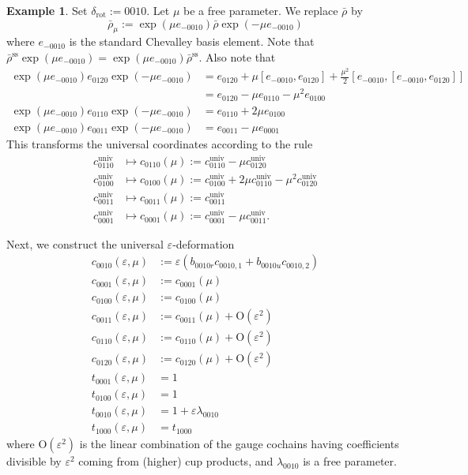 \documentclass[11pt]{amsart}
\newcommand{\MINOREDITED}[1]{#1}
\theoremstyle{definition}
\newtheorem{example}[thm]{Example}
\renewcommand{\SS}{{\operatorname{ss}}}
\newcommand{\rot}{{\operatorname{rot}}}
\newcommand{\univ}{{\operatorname{univ}}}
\begin{document}
\begin{example}
Set $\delta_{\rot}:=0010$.
Let $\mu$
be a free parameter.
We replace
$\bar\rho$ by
\[
\bar\rho_\mu:=\exp(\mu e_{-0010})\bar\rho \exp(-\mu e_{-0010})
\]
where $e_{-0010}$ is the standard Chevalley basis element.
Note that
$\bar\rho^\SS\exp(\mu e_{-0010})=\exp(\mu e_{-0010})\bar\rho^\SS$.
Also note that
\begin{align*}
\exp(\mu e_{-0010})e_{0120} \exp(-\mu e_{-0010})
&=e_{0120}
+ \mu[e_{-0010},e_{0120}]
+ \frac{\mu^2}{2}[e_{-0010},[e_{-0010},e_{0120}]]
\\&=
e_{0120}
-\mu e_{0110}
-\mu^2 e_{0100}
\\
\exp(\mu e_{-0010})e_{0110} \exp(-\mu e_{-0010})
&=
e_{0110} + 2\mu e_{0100}
\\
\exp(\mu e_{-0010})e_{0011} \exp(-\mu e_{-0010})
&=
e_{0011} -\mu e_{0001}
\end{align*}
This transforms the universal coordinates
according to the rule
\begin{align*}
c_{0110}^\univ &\mapsto
c_{0110}(\mu):=  c^{\univ}_{0110}-\mu c^{\univ}_{0120}\\
c^\univ_{0100} &\mapsto c_{0100}(\mu):= 
c^\univ_{0100}+2\mu c^\univ_{0110}
-\mu^2c^\univ_{0120}\\
c^\univ_{0011} &\mapsto c_{0011}(\mu):= 
c_{0011}^\univ\\
c^\univ_{0001} &\mapsto c_{0001}(\mu):= 
c^\univ_{0001}-\mu c^\univ_{\MINOREDITED{0011}}.
\end{align*}

Next, we construct the universal
$\varepsilon$-deformation
\begin{align*}
c_{0010}(\varepsilon, \mu)&:=
\varepsilon (b_{0010r}c_{0010,1}
+b_{0010u}c_{0010,2}) \\
c_{0001}(\varepsilon, \mu)&:=
c_{0001}(\mu) \\
c_{0100}(\varepsilon, \mu)&:=
c_{0100}(\mu) \\
c_{0011}(\varepsilon, \mu)&:=
c_{0011}(\mu) +\mathrm{O}(\varepsilon^2)
\\
c_{0110}(\varepsilon, \mu)&:=
c_{0110}(\mu) +\mathrm{O}(\varepsilon^2)
\\
c_{0120}(\varepsilon, \mu)&:=
c_{0120}(\mu) +\mathrm{O}(\varepsilon^2)
\\
t_{0001}(\varepsilon, \mu)&=1 \\
t_{0100}(\varepsilon, \mu)&=1 \\
t_{0010}(\varepsilon, \mu)&=1+\varepsilon \lambda_{0010} \\
t_{1000}(\varepsilon, \mu)&= t_{1000}
\end{align*}
where $\mathrm{O}(\varepsilon^2)$
is the linear combination of the gauge cochains
having coefficients divisible by $\varepsilon^2$
coming from (higher) cup products,
and $\lambda_{0010}$ is a free parameter.


\end{example}
\end{document}
